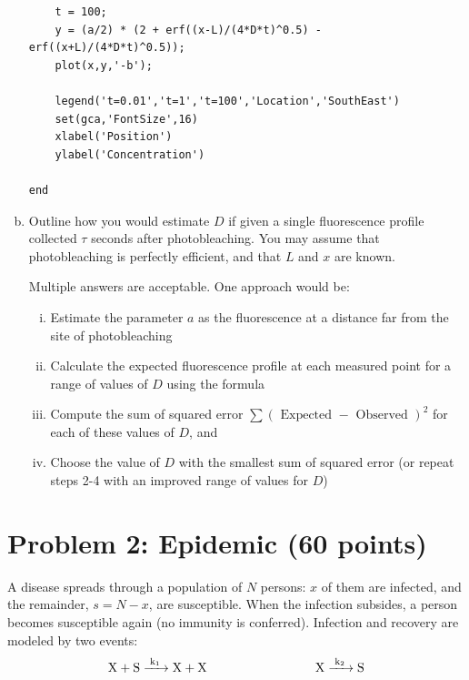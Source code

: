 \documentclass{article}
\begin{document}
\begin{enumerate}[a)]
\begin{lstlisting}
    t = 100;
    y = (a/2) * (2 + erf((x-L)/(4*D*t)^0.5) - erf((x+L)/(4*D*t)^0.5));
    plot(x,y,'-b');
    
    legend('t=0.01','t=1','t=100','Location','SouthEast')
    set(gca,'FontSize',16)
    xlabel('Position')
    ylabel('Concentration')
    
end
\end{lstlisting}

\item Outline how you would estimate $D$ if given a single fluorescence profile collected $\tau$ seconds after photobleaching. You may assume that photobleaching is perfectly efficient, and that $L$ and $x$ are known.\\

{\color{red}
Multiple answers are acceptable. One approach would be:
\begin{enumerate}[i)]
\item Estimate the parameter $a$ as the fluorescence at a distance far from the site of photobleaching
\item Calculate the expected fluorescence profile at each measured point for a range of values of $D$ using the formula
\item Compute the sum of squared error $\sum (\textrm{ Expected } - \textrm{ Observed })^2$ for each of these values of $D$, and
\item Choose the value of $D$ with the smallest sum of squared error (or repeat steps 2-4 with an improved range of values for $D$)
\end{enumerate}
}

\end{enumerate}

\section*{Problem 2: Epidemic (60 points)}
A disease spreads through a population of $N$ persons: $x$ of them are infected, and the remainder, $s=N-x$, are susceptible. When the infection subsides, a person becomes susceptible again (no immunity is conferred). Infection and recovery are modeled by two events:
\[ \ce{X + S ->[k_1] X + X} \hspace{3 cm} \ce{X ->[k_2] S}  \]
\end{document}
